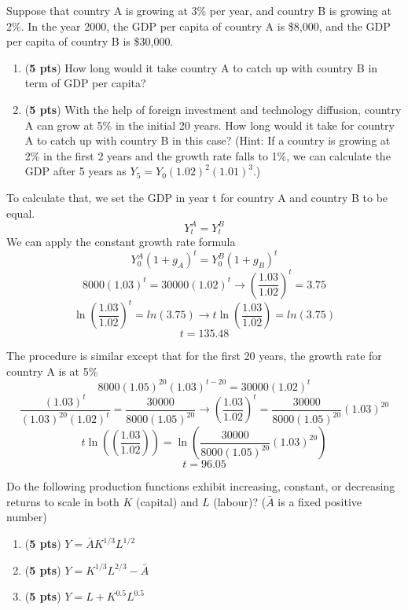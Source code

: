 \documentclass[addpoints,12pt,answers]{exam}
\begin{document}
\begin{questions}
		\clearpage
		\question  [10] Suppose that country A is growing at 3\% per year, and country B is growing at 2\%. In the year 2000, the GDP per capita of country A is \$8,000, and the GDP per capita of country B is \$30,000.
		
		\begin{enumerate}[label=(\alph*)]
			\item (\textbf{5 pts}) How long would it take country A to catch up with country B in term of GDP per capita?
			\item (\textbf{5 pts}) With the help of foreign investment and technology diffusion, country A can grow at 5\% in the initial 20 years. How long would it take for country A to catch up with country B in this case? (Hint: If a country is growing at 2\% in the first 2 years and the growth rate falls to 1\%, we can calculate the GDP after 5 years as $Y_5 = Y_0(1.02)^2(1.01)^3$.)
		\end{enumerate}
		\clearpage
		\begin{solution}
			\begin{parts}
				\item To calculate that, we set the GDP in year t for country A and country B to be equal.
				\[Y^A_t =Y^B_t\]
				We can apply the constant growth rate formula
				\[Y^A_0 (1+g_A)^t = Y^B_0 (1+g_B)^t \]
				\[8000 (1.03)^t = 30000 (1.02)^t  \to \left(\frac{1.03}{1.02}\right)^t = 3.75\]
				\[\ln\left(\frac{1.03}{1.02}\right)^t = ln\left(3.75\right) \to t\ln\left(\frac{1.03}{1.02}\right) = ln\left(3.75\right)\]
				\[t= 135.48\]
				\item The procedure is similar except that for the first 20 years, the growth rate for country A is at 5\%
				\[8000 (1.05)^{20}(1.03)^{t-20} = 30000 (1.02)^t\]
				\[\frac{(1.03)^{t}}{(1.03)^{20}(1.02)^t} = \frac{30000}{8000 (1.05)^{20}} \to \left(\frac{1.03}{1.02}\right)^t = \frac{30000}{8000 (1.05)^{20}} (1.03)^{20}\]
				\[t \ln\left(\left(\frac{1.03}{1.02}\right)\right) = \ln\left(\frac{30000}{8000 (1.05)^{20}} (1.03)^{20}\right)\]
				\[t = 96.05\]
			\end{parts}
		\end{solution}
		
		\clearpage
		\question  [15] Do the following production functions exhibit increasing, constant, or decreasing returns to scale in both $K$ (capital) and $L$ (labour)? ($\bar{A}$ is a fixed positive number)
		\begin{enumerate}
			\item (\textbf{5 pts}) $Y=\bar{A}K^{1/3}L^{1/2}$
			\item (\textbf{5 pts}) $Y=K^{1/3}L^{2/3} - \bar{A}$
			\item (\textbf{5 pts}) $Y= L+K^{0.5}L^{0.5}$
		\end{enumerate}
		

\end{questions}
\end{document}

